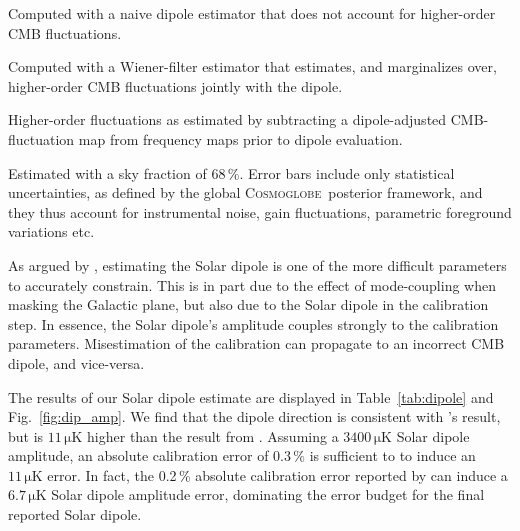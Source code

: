 \documentclass[twocolumn]{../../common/aa}
\newcommand{\cosmoglobe}{\textsc{Cosmoglobe}}
\begin{document}
\begin{table}
 Computed with a naive dipole estimator that does not account for higher-order CMB fluctuations.\par
{} Computed with a Wiener-filter estimator that estimates, and marginalizes over, higher-order CMB fluctuations jointly with the dipole.\par
{} Higher-order fluctuations as estimated by subtracting a dipole-adjusted CMB-fluctuation map from frequency maps prior to dipole evaluation. \par
{} Estimated with a sky fraction of 68\,\%. Error bars include only statistical uncertainties, as defined by the global \cosmoglobe\ posterior framework, and they thus account for instrumental noise, gain fluctuations, parametric foreground variations etc. 
\par
\end{table}

As argued by \citet{thommesen:2019}, estimating the Solar dipole is one of the more difficult parameters to accurately constrain. This is in part due to the effect of mode-coupling when masking the Galactic plane, but also due to the Solar dipole in the calibration step. In essence, the Solar dipole's amplitude couples strongly to the calibration parameters. Misestimation of the calibration can propagate to an incorrect CMB dipole, and vice-versa.

The results of our Solar dipole estimate are displayed in Table~\ref{tab:dipole} and Fig.~\ref{fig:dip_amp}. We find that the dipole direction is consistent with \citet{bp11}'s result, but is $11\,\mathrm{\mu K}$ higher than the result from \citet{hinshaw2009}. Assuming a $3400\,\mathrm{\mu K}$ Solar dipole amplitude, an absolute calibration error of $0.3\,\%$ is sufficient to to induce an $11\,\mathrm{\mu K}$ error. In fact, the 0.2\,\% absolute calibration error reported by \citet{bennett2012} can induce a $6.7\,\mathrm{\mu K}$ Solar dipole amplitude error, dominating the error budget for the final reported Solar dipole.
\end{document}
